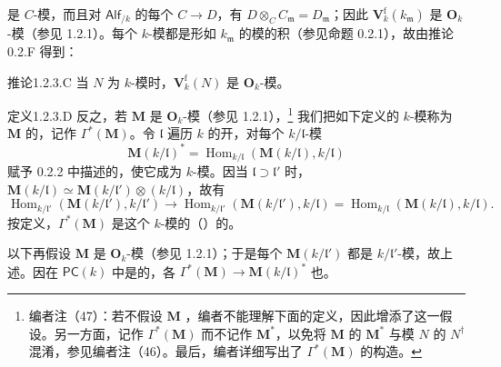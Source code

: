 是 $C$-模，而且对 $\mathsf{Alf}_{/k}$ 的每个 $C\to D$，有 $D\otimes_C C_{\mathfrak m}=D_{\mathfrak m}$；因此 $\mathbf V_k^{\mathrm f}(k_{\mathfrak m})$ 是 $\mathbf O_k$-模（参见 1.2.1）。每个 $k$-模都是形如 $k_{\mathfrak m}$ 的模的积（参见命题 0.2.1），故由推论 0.2.F 得到：
\begin{SGAresult}{推论}{1.2.3.C}
当 $N$ 为 $k$-模时，$\mathbf V_k^{\mathrm f}(N)$ 是 $\mathbf O_k$-模。
\end{SGAresult}
\begin{SGAresult}{定义}{1.2.3.D}
反之，若 $\mathbf M$ 是 $\mathbf O_k$-模（参见 1.2.1），\footnote{编者注（47）：若不假设 $\mathbf M$ ，编者不能理解下面的定义，因此增添了这一假设。另一方面，记作 $\Gamma^*(\mathbf M)$ 而不记作 $\mathbf M^*$，以免将 $\mathbf M$ 的 $\mathbf M^*$ 与模 $N$ 的 $N^\dagger$ 混淆，参见编者注（46）。最后，编者详细写出了 $\Gamma^*(\mathbf M)$ 的构造。} 我们把如下定义的 $k$-模称为 $\mathbf M$ 的，记作 $\Gamma^*(\mathbf M)$。令 $\mathfrak l$ 遍历 $k$ 的开，对每个 $k/\mathfrak l$-模
\[
 \mathbf M(k/\mathfrak l)^*=\operatorname{Hom}_{k/\mathfrak l}(\mathbf M(k/\mathfrak l),k/\mathfrak l)
\]
赋予 0.2.2 中描述的，使它成为 $k$-模。因当 $\mathfrak l\supset\mathfrak l'$ 时，$\mathbf M(k/\mathfrak l)\simeq\mathbf M(k/\mathfrak l')\otimes(k/\mathfrak l)$，故有
\[
\operatorname{Hom}_{k/\mathfrak l'}(\mathbf M(k/\mathfrak l'),k/\mathfrak l')
\longrightarrow\operatorname{Hom}_{k/\mathfrak l'}(\mathbf M(k/\mathfrak l'),k/\mathfrak l)
=\operatorname{Hom}_{k/\mathfrak l}(\mathbf M(k/\mathfrak l),k/\mathfrak l).
\]
按定义，$\Gamma^*(\mathbf M)$ 是这个 $k$-模的（）的。
\end{SGAresult}
以下再假设 $\mathbf M$ 是 $\mathbf O_k$-模（参见 1.2.1）；于是每个 $\mathbf M(k/\mathfrak l')$ 都是 $k/\mathfrak l'$-模，故上述。因在 $\mathsf{PC}(k)$ 中是的，各 $\Gamma^*(\mathbf M)\to\mathbf M(k/\mathfrak l)^*$ 也。

